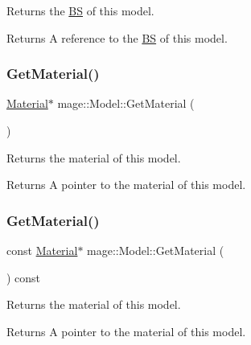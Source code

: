 Returns the \hyperlink{structmage_1_1_b_s}{BS} of this model.

\begin{DoxyReturn}{Returns}
A reference to the \hyperlink{structmage_1_1_b_s}{BS} of this model. 
\end{DoxyReturn}
\hypertarget{classmage_1_1_model_a46728db5ca9052c62e9403ec7d6a6c21}{}\label{classmage_1_1_model_a46728db5ca9052c62e9403ec7d6a6c21} 
\subsubsection{\texorpdfstring{Get\+Material()}{GetMaterial()}\hspace{0.1cm}{\footnotesize\ttfamily [1/2]}}
{\footnotesize\ttfamily \hyperlink{classmage_1_1_material}{Material}$\ast$ mage\+::\+Model\+::\+Get\+Material (\begin{DoxyParamCaption}{ }\end{DoxyParamCaption})\hspace{0.3cm}{\ttfamily [noexcept]}}

Returns the material of this model.

\begin{DoxyReturn}{Returns}
A pointer to the material of this model. 
\end{DoxyReturn}
\hypertarget{classmage_1_1_model_a10a9de6608365356b5b6ad2669ab39f8}{}\label{classmage_1_1_model_a10a9de6608365356b5b6ad2669ab39f8} 
\subsubsection{\texorpdfstring{Get\+Material()}{GetMaterial()}\hspace{0.1cm}{\footnotesize\ttfamily [2/2]}}
{\footnotesize\ttfamily const \hyperlink{classmage_1_1_material}{Material}$\ast$ mage\+::\+Model\+::\+Get\+Material (\begin{DoxyParamCaption}{ }\end{DoxyParamCaption}) const\hspace{0.3cm}{\ttfamily [noexcept]}}

Returns the material of this model.

\begin{DoxyReturn}{Returns}
A pointer to the material of this model. 
\end{DoxyReturn}
\hypertarget{classmage_1_1_model_a37c9814a445159fd742bcc1b9a5a7b94}{}\label{classmage_1_1_model_a37c9814a445159fd742bcc1b9a5a7b94} 
